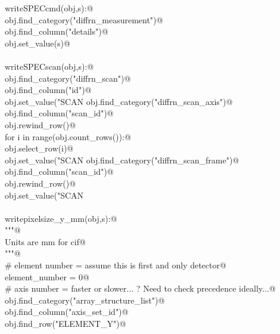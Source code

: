 \documentclass[10pt,a4paper,twoside,notitlepage]{article}
\begin{document}
\begin{flushleft}
\begin{list}{}{}
\mbox{}\verb@def writeSPECcmd(obj,s):@\\
\mbox{}\verb@    obj.find_category("diffrn_measurement")@\\
\mbox{}\verb@    obj.find_column("details")@\\
\mbox{}\verb@    obj.set_value(s)@\\
\mbox{}\verb@@\\
\mbox{}\verb@def writeSPECscan(obj,s):@\\
\mbox{}\verb@    obj.find_category("diffrn_scan")@\\
\mbox{}\verb@    obj.find_column("id")@\\
\mbox{}\verb@    obj.set_value("SCAN%s"%(s))@\\
\mbox{}\verb@    obj.find_category("diffrn_scan_axis")@\\
\mbox{}\verb@    obj.find_column("scan_id")@\\
\mbox{}\verb@    obj.rewind_row()@\\
\mbox{}\verb@    for i in range(obj.count_rows()):@\\
\mbox{}\verb@        obj.select_row(i)@\\
\mbox{}\verb@        obj.set_value("SCAN%s"%(s))@\\
\mbox{}\verb@    obj.find_category("diffrn_scan_frame")@\\
\mbox{}\verb@    obj.find_column("scan_id")@\\
\mbox{}\verb@    obj.rewind_row()@\\
\mbox{}\verb@    obj.set_value("SCAN%s"%(s))@\\
\mbox{}\verb@@\\
\mbox{}\verb@@\\
\mbox{}\verb@def writepixelsize_y_mm(obj,s):@\\
\mbox{}\verb@    """@\\
\mbox{}\verb@    Units are mm for cif@\\
\mbox{}\verb@    """@\\
\mbox{}\verb@    # element number  = assume this is first and only detector@\\
\mbox{}\verb@    element_number = 0@\\
\mbox{}\verb@    # axis number = faster or slower... ? Need to check precedence ideally...@\\
\mbox{}\verb@    obj.find_category("array_structure_list")@\\
\mbox{}\verb@    obj.find_column("axis_set_id")@\\
\mbox{}\verb@    obj.find_row("ELEMENT_Y")@\\

\end{list}
\end{flushleft}
\end{document}
